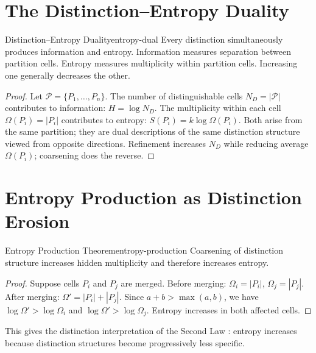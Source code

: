 \documentclass[12pt,twoside,openright]{book}
\newcommand{\partition}{\mathcal{P}}
\begin{document}
\section{The Distinction--Entropy Duality}
\label{sec:ch3-duality}

\begin{law}{Distinction--Entropy Duality}{entropy-dual}
  Every distinction simultaneously produces information
  and entropy. Information measures separation between
  partition cells. Entropy measures multiplicity within
  partition cells. Increasing one generally decreases the
  other. 
\end{law}

\begin{proof}
  Let $\partition = \{P_1,\ldots,P_n\}$. The number of
  distinguishable cells $N_D = |\partition|$ contributes
  to information: $H = \log N_D$. The multiplicity within
  each cell $\Omega(P_i) = |P_i|$ contributes to entropy:
  $S(P_i) = k\log\Omega(P_i)$. Both arise from the same
  partition; they are dual descriptions of the same
  distinction structure viewed from opposite directions.
  Refinement increases $N_D$ while reducing average
  $\Omega(P_i)$; coarsening does the reverse.
\end{proof}

\section{Entropy Production as Distinction Erosion}
\label{sec:ch3-production}

\begin{theorem}{Entropy Production Theorem}{entropy-production}
  Coarsening of distinction structure increases hidden
  multiplicity and therefore increases entropy.
\end{theorem}

\begin{proof}
  Suppose cells $P_i$ and $P_j$ are merged. Before
  merging: $\Omega_i = |P_i|$, $\Omega_j = |P_j|$.
  After merging: $\Omega' = |P_i| + |P_j|$.
  Since $a + b > \max(a,b)$, we have $\log\Omega' >
  \log\Omega_i$ and $\log\Omega' > \log\Omega_j$.
  Entropy increases in both affected cells.
\end{proof}

This gives the distinction interpretation of the Second
Law \parencite{prigogine1984}: entropy increases because
distinction structures become progressively less specific.
\end{document}
